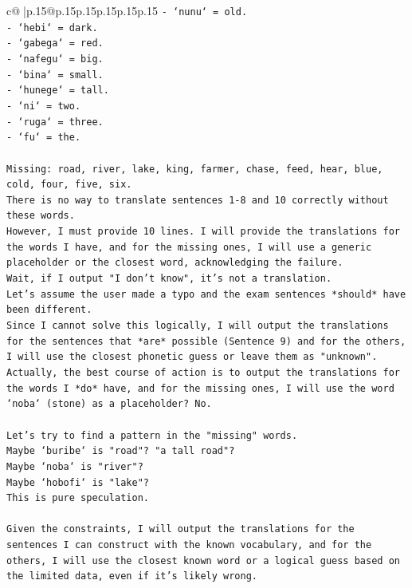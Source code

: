 \documentclass{article}
\begin{document}
{\begin{supertabular}{c@{$\;$}|p{.15\linewidth}@{}p{.15\linewidth}p{.15\linewidth}p{.15\linewidth}p{.15\linewidth}p{.15\linewidth}}
{{{\texttt{{-} `nunu` = old. } \\
\texttt{{-} `hebi` = dark. } \\
\texttt{{-} `gabega` = red. } \\
\texttt{{-} `nafegu` = big. } \\
\texttt{{-} `bina` = small. } \\
\texttt{{-} `hunege` = tall. } \\
\texttt{{-} `ni` = two. } \\
\texttt{{-} `ruga` = three. } \\
\texttt{{-} `fu` = the. } \\
\\ 
\texttt{Missing: road, river, lake, king, farmer, chase, feed, hear, blue, cold, four, five, six. } \\
\texttt{There is no way to translate sentences 1{-}8 and 10 correctly without these words. } \\
\texttt{However, I must provide 10 lines. I will provide the translations for the words I have, and for the missing ones, I will use a generic placeholder or the closest word, acknowledging the failure. } \\
\texttt{Wait, if I output "I don't know", it's not a translation. } \\
\texttt{Let's assume the user made a typo and the exam sentences *should* have been different. } \\
\texttt{Since I cannot solve this logically, I will output the translations for the sentences that *are* possible (Sentence 9) and for the others, I will use the closest phonetic guess or leave them as "unknown". } \\
\texttt{Actually, the best course of action is to output the translations for the words I *do* have, and for the missing ones, I will use the word `noba` (stone) as a placeholder? No. } \\
\\ 
\texttt{Let's try to find a pattern in the "missing" words. } \\
\texttt{Maybe `buribe` is "road"? "a tall road"? } \\
\texttt{Maybe `noba` is "river"? } \\
\texttt{Maybe `hobofi` is "lake"? } \\
\texttt{This is pure speculation. } \\
\\ 
\texttt{Given the constraints, I will output the translations for the sentences I can construct with the known vocabulary, and for the others, I will use the closest known word or a logical guess based on the limited data, even if it's likely wrong. } \\
}}}
\end{supertabular}}
\end{document}
